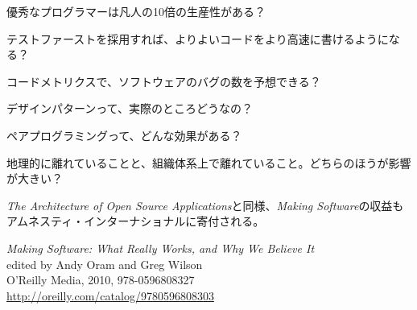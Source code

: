 \begin{aosaitemize}

\item 優秀なプログラマーは凡人の10倍の生産性がある？

\item テストファーストを採用すれば、よりよいコードをより高速に書けるようになる？

\item コードメトリクスで、ソフトウェアのバグの数を予想できる？

\item デザインパターンって、実際のところどうなの？

\item ペアプログラミングって、どんな効果がある？

\item 地理的に離れていることと、組織体系上で離れていること。どちらのほうが影響が大きい？

\end{aosaitemize}

\vspace{-0.2cm}

\setlength{\parskip}{0.15cm}

\noindent \emph{The Architecture of Open Source Applications}と同様、\emph{Making Software}の収益もアムネスティ・インターナショナルに寄付される。

\noindent \emph{Making Software: What Really Works, and Why We Believe It} \\
edited by Andy Oram and Greg Wilson \\
O'Reilly Media, 2010, 978-0596808327 \\
\url{http://oreilly.com/catalog/9780596808303}

\normalfont

\pagebreak
\thispagestyle{empty}

